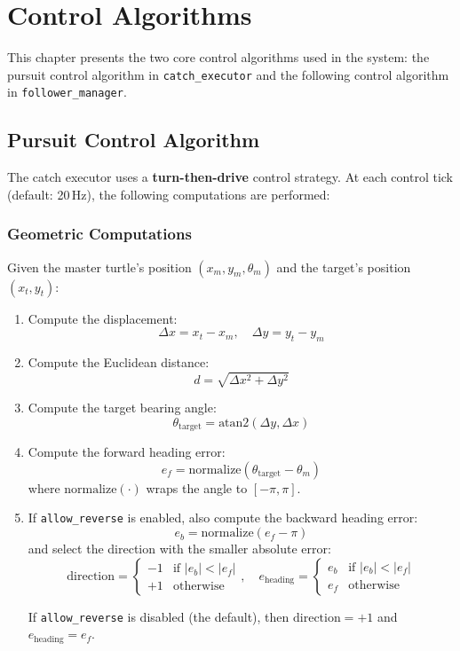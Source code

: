 \chapter{Control Algorithms\label{chap:algorithms}}

This chapter presents the two core control algorithms used in the system: the pursuit control algorithm in \texttt{catch\_executor} and the following control algorithm in \texttt{follower\_manager}.

\section{Pursuit Control Algorithm}

The catch executor uses a \textbf{turn-then-drive} control strategy. At each control tick (default: 20\,Hz), the following computations are performed:

\subsection{Geometric Computations}

Given the master turtle's position $(x_m, y_m, \theta_m)$ and the target's position $(x_t, y_t)$:

\begin{enumerate}
  \item Compute the displacement:
  \[
    \Delta x = x_t - x_m, \quad \Delta y = y_t - y_m
  \]

  \item Compute the Euclidean distance:
  \[
    d = \sqrt{\Delta x^2 + \Delta y^2}
  \]

  \item Compute the target bearing angle:
  \[
    \theta_{\text{target}} = \text{atan2}(\Delta y, \Delta x)
  \]

  \item Compute the forward heading error:
  \[
    e_f = \text{normalize}(\theta_{\text{target}} - \theta_m)
  \]
  where $\text{normalize}(\cdot)$ wraps the angle to $[-\pi, \pi]$.

  \item If \texttt{allow\_reverse} is enabled, also compute the backward heading error:
  \[
    e_b = \text{normalize}(e_f - \pi)
  \]
  and select the direction with the smaller absolute error:
  \[
    \text{direction} = \begin{cases} -1 & \text{if } |e_b| < |e_f| \\ +1 & \text{otherwise} \end{cases}, \quad e_{\text{heading}} = \begin{cases} e_b & \text{if } |e_b| < |e_f| \\ e_f & \text{otherwise} \end{cases}
  \]

  If \texttt{allow\_reverse} is disabled (the default), then $\text{direction} = +1$ and $e_{\text{heading}} = e_f$.
\end{enumerate}

